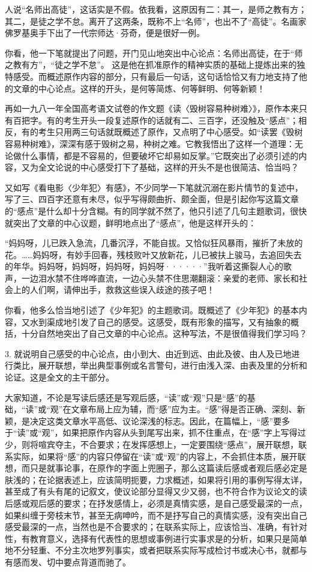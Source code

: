 人说“名师出高徒”，这话实是不假。依我看，这原因有二：其一，是师之教有方；其二，是徒之学不怠。离开了这两条，既称不上“名师”，也出不了“高徒”。名画家佛罗基奥手下出了一代宗师达·芬奇，便是很好一例。

你看，他一下笔就提出了问题，开门见山地突出中心论点：名师出高徒，在于“师之教有方”，“徒之学不怠”。
这是他在抓准原作的精神实质的基础上提炼出来的独特感受。而概述原作内容的部分，只有最后一句话，这句话恰恰又有力地支持了他的文章的中心论点。这样的开头，是何等简炼、何等鲜明、何等新颖！

再如一九八一年全国高考语文试卷的作文题《读〈毁树容易种树难〉》，原作本来只有百把字。有的考生开头一段复述原作的话就有二、三百字，还没触及“感点”；相反，有的考生只用两三句话就既概述了原作，又点明了中心感受。如“读罢《毁树容易种树难》，深深有感于毁树之易，种树之难。它教我悟出了这样一个道理：无论做什么事情，都是不容易的，但要破坏它却易如反掌。”它既突出了必须引述的内容，又为全文论说的中心感受打下了基础，这样的开头不是也很简洁、恰当吗？

又如写《看电影〈少年犯〉有感》，不少同学一下笔就沉溺在影片情节的复述中，写了三、四百字还意有未尽，似乎写得颇曲折、颇全面，但是引起你写这篇文章的“感点”是什么却十分含糊。有的同学就不然了，他只引述了几句主题歌词，很快就突出了文章的中心议题，鲜明地点出了“感点”，他是这样开头的：

“妈妈呀，儿已跌入急流，几番沉浮，不能自拔。又恰似狂风暴雨，摧折了未放的花。……妈妈呀，有妙手回春，残枝败叶又放新花，儿已被扶上骏马，去追回失去的年华。妈妈呀，妈妈呀，妈妈呀，妈妈呀······”我听着这撕裂人心的歌声，一边泪水禁不住哗哗直流，一边心头禁不住思潮翻滚：亲爱的老师、家长和社会上的人们啊，请伸出手，救救这些误入歧途的孩子吧！

你看，他多么恰当地引述了《少年犯》的主题歌词。既概述了《少年犯》的基本内容，又水到渠成地引发了自己的感受。这感受，既有形象的描写，又有抽象的概括，十分自然地突出了自己文章的中心论点。这种写法，不是很值得我们学习吗？

3. 就说明自己感受的中心论点，由小到大、由近到远、由此及彼、由人及已地进行类比，展开联想，举出典型事例或名言警句，进行由浅入深、由表及里的分析和论证。这是全文的主干部分。

大家知道，不论是写读后感还是写观后感，“读”或“观”只是“感”的基础，“读”或“观”在文章布局上应为辅，而“感”应为主。“感”得是否正确、深刻、新颖，是决定这类文章水平高低、议论深浅的标志。因此，在篇幅上，“感”要多于“读”或“观”，如果把原作内容从头到尾写出来，抓不住重点，在“感”字上写得过少，则将喧宾夺主，不合要求；在发挥感想上，一定要围绕“感点”，展开联想，联系实际，如果将“感”的内容只停留在“读”或“观”的内容上，不会抓住本质，展开联想，而只是就事论事，在原作的字面上兜圈子，那么这篇读后感或者观后感必定是肤浅的；在论据表述上，应该简明扼要，力求概述，如果将引用的事例写得太详，甚至成了有头有尾的记叙文，使议论部分显得又少又弱，也不符合作为议论文的读后感或观后感的要求；在抒发感情上，必须是真情实感，是自己感受最深的一点，如果纠缠于旁枝末节，甚至无病呻吟，而不是抒写自己的真情实感，没有突出自己感受最深的一点，当然也是不合要求的；在联系实际上，应该恰当、准确，有针对性，有教育意义，选择有代表性的思想或事例进行实事求是的分析，如果只是简单地不分轻重、不分主次地罗列事实，或者把联系实际写成检讨书或决心书，就都与有感而发、切中要点背道而驰了。


